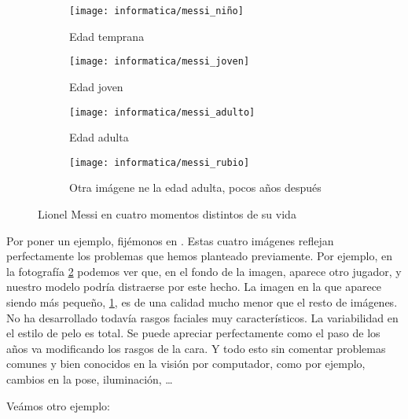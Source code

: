 \begin{figure}[H]
\centering
    \begin{subfigure}{0.5\textwidth}
        \centering
        \texttt{[image: informatica/messi\_niño]}
        \caption{Edad temprana}
        \label{img:messi_pequeño}
    \end{subfigure}%
    \begin{subfigure}{.5\textwidth}
        \centering
        \texttt{[image: informatica/messi\_joven]}
        \caption{Edad joven}
    \end{subfigure}%

    \begin{subfigure}{.5\textwidth}
        \centering
        \texttt{[image: informatica/messi\_adulto]}
        \caption{Edad adulta}
        \label{img:messi_adulto}
    \end{subfigure}%
    \begin{subfigure}{.5\textwidth}
        \centering
        \texttt{[image: informatica/messi\_rubio]}
        \caption{Otra imágene ne la edad adulta, pocos años después}
    \end{subfigure}

    \caption{Lionel Messi en cuatro momentos distintos de su vida}
    \label{img:messi_cuatro_edades}

\end{figure}

Por poner un ejemplo, fijémonos en  \footnotemark. Estas cuatro imágenes reflejan perfectamente los problemas que hemos planteado previamente. Por ejemplo, en la fotografía \ref{img:messi_adulto} podemos ver que, en el fondo de la imagen, aparece otro jugador, y nuestro modelo podría distraerse por este hecho. La imagen en la que aparece siendo más pequeño, \ref{img:messi_pequeño}, es de una calidad mucho menor que el resto de imágenes. No ha desarrollado todavía rasgos faciales muy característicos. La variabilidad en el estilo de pelo es total. Se puede apreciar perfectamente como el paso de los años va modificando los rasgos de la cara. Y todo esto sin comentar problemas comunes y bien conocidos en la visión por computador, como por ejemplo, cambios en la pose, iluminación, \ldots
{}

Veámos otro ejemplo:

